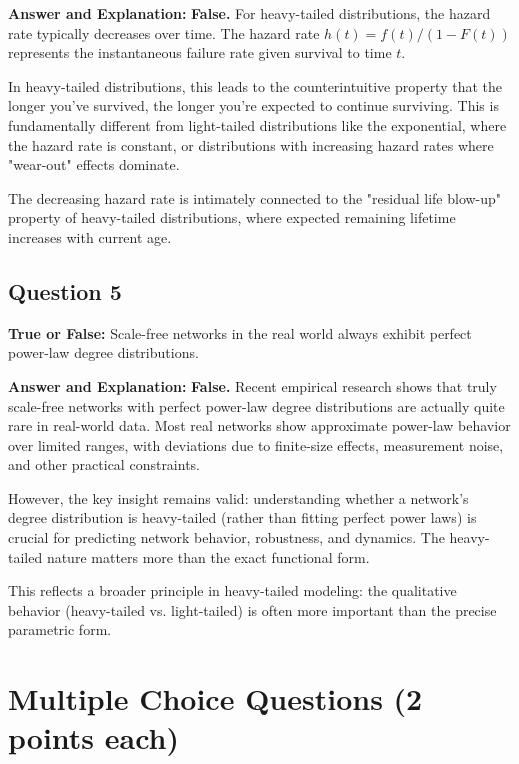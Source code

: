 \documentclass[11pt]{article}
\newenvironment{answer}{\color{answercolor}\begin{framed}\textbf{Answer and Explanation:}}{\end{framed}}
\begin{document}
\begin{answer}
\textbf{False.} For heavy-tailed distributions, the hazard rate typically decreases over time. The hazard rate $h(t) = f(t)/(1-F(t))$ represents the instantaneous failure rate given survival to time $t$.

In heavy-tailed distributions, this leads to the counterintuitive property that the longer you've survived, the longer you're expected to continue surviving. This is fundamentally different from light-tailed distributions like the exponential, where the hazard rate is constant, or distributions with increasing hazard rates where "wear-out" effects dominate.

The decreasing hazard rate is intimately connected to the "residual life blow-up" property of heavy-tailed distributions, where expected remaining lifetime increases with current age.
\end{answer}

\subsection{Question 5}
\textbf{True or False:} Scale-free networks in the real world always exhibit perfect power-law degree distributions.

\begin{answer}
\textbf{False.} Recent empirical research shows that truly scale-free networks with perfect power-law degree distributions are actually quite rare in real-world data. Most real networks show approximate power-law behavior over limited ranges, with deviations due to finite-size effects, measurement noise, and other practical constraints.

However, the key insight remains valid: understanding whether a network's degree distribution is heavy-tailed (rather than fitting perfect power laws) is crucial for predicting network behavior, robustness, and dynamics. The heavy-tailed nature matters more than the exact functional form.

This reflects a broader principle in heavy-tailed modeling: the qualitative behavior (heavy-tailed vs. light-tailed) is often more important than the precise parametric form.
\end{answer}

\section{Multiple Choice Questions (2 points each)}
\end{document}

